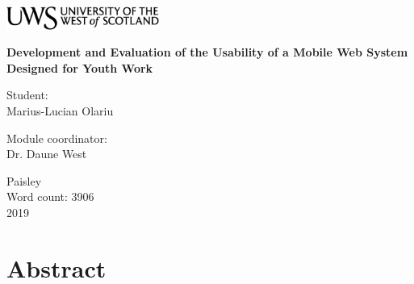 \documentclass[version=last,fontsize=13pt]{scrartcl}
\begin{document}
\begin{titlepage}
	\begin{center}	
		\includegraphics[width = 5cm,height = 1.5cm]{./imgs/uws_logo.png}\\[5cm]

	{ \huge \bfseries %
		Development and Evaluation of the Usability of a Mobile Web System Designed for Youth Work\\ \Large}

	\vspace{2cm}
	
	\vspace{2cm}			
			

			
		\begin{flushright}
				\large Student:\\
				Marius-Lucian Olariu\\[1cm]
		\end{flushright}
		
	
		\begin{flushleft}
			 \large
				Module coordinator: \\
				Dr. Daune West \\[1cm]
		\end{flushleft}
		
	\vspace{2cm}	
	
		
		\vfill

			{\large {Paisley \\ Word count: 3906 \\ 2019}}
		\end{center}
\end{titlepage}

\renewcommand{\labelenumi}{\roman{enumi}}

\newpage

\tableofcontents

\newpage



\section{Abstract}%
\end{document}
